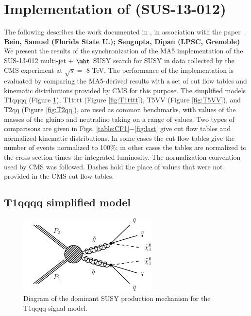 \section{Implementation of (SUS-13-012)}
\label{app:ma5multijet}
The following describes the work documented in \cite{MA5-CMS-SUS-13-012}, in association with the paper~\cite{MA5-CMS-SUS-13-012}.
\textbf{Bein, Samuel (Florida State U.); Sengupta, Dipan (LPSC, Grenoble)}\\
We present the results of the synchronization of the MA5
implementation of the SUS-13-012 multi-jet $+$ $\mht$ SUSY search for SUSY in data collected 
by the CMS experiment at $\sqrt{s}=$ 8 TeV.  The
performance of the implementation is evaluated by comparing the
MA5-derived results with a set of cut flow tables and kinematic
distributions provided by CMS for this purpose. The simplified models
T1qqqq (Figure \ref{fig:T1qqqq}), T1tttt (Figure \ref{fig:T1tttt}), T5VV (Figure \ref{fig:T5VV}), and T2qq (Figure \ref{fig:T2qq}), are used as common benchmarks, with values of the masses of the
gluino and neutralino taking on a range of values. Two types of
comparisons are given in Figs. \ref{table:CF1}$-$\ref{fig:last} give cut flow tables and normalized
kinematic distributions. In some cases the
cut flow tables give the number of events normalized to 100\%; in
other cases the tables are normalized to the cross section times the
integrated luminosity. The normalization convention used by CMS was
followed. Dashes hold the place of values that were not
provided in the CMS cut flow tables. 

\subsection{T1qqqq simplified model}
\begin{figure}[h!]
\centering
\includegraphics[width=7cm]{figures/Appendices/Ma5ValidationSUS13012/T1qqqq.pdf}
\caption{Diagram of the dominant SUSY production mechanism
for the T1qqqq signal model.}
\label{fig:T1qqqq}
\end{figure}

